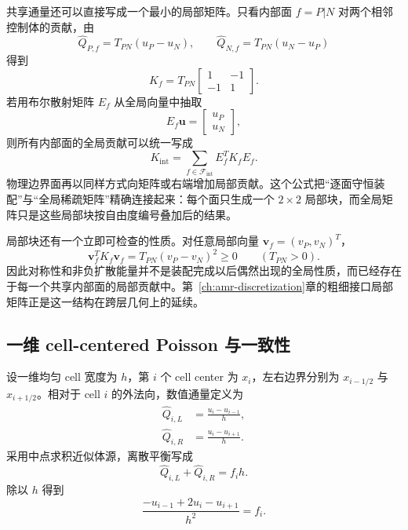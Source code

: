 共享通量还可以直接写成一个最小的局部矩阵。只看内部面 $f=P|N$ 对两个相邻控制体的贡献，由
\begin{equation}
\widehat Q_{P,f}=T_{PN}(u_P-u_N),
\qquad
\widehat Q_{N,f}=T_{PN}(u_N-u_P)
\end{equation}
得到
\begin{equation}
\boxed{
K_f
=
T_{PN}
\begin{bmatrix}
1&-1\\
-1&1
\end{bmatrix}.
}
\label{eq:discretization-face-local-matrix}
\end{equation}
若用布尔散射矩阵 $E_f$ 从全局向量中抽取
\begin{equation}
E_f\bm u=
\begin{bmatrix}
u_P\\u_N
\end{bmatrix},
\end{equation}
则所有内部面的全局贡献可以统一写成
\begin{equation}
\boxed{
K_{\mathrm{int}}
=
\sum_{f\in\mathcal F_{\mathrm{int}}}
E_f^TK_fE_f.
}
\label{eq:discretization-face-assembly-sum}
\end{equation}
物理边界面再以同样方式向矩阵或右端增加局部贡献。这个公式把“逐面守恒装配”与“全局稀疏矩阵”精确连接起来：每个面只生成一个 $2\times2$ 局部块，而全局矩阵只是这些局部块按自由度编号叠加后的结果。

局部块还有一个立即可检查的性质。对任意局部向量 $\bm v_f=(v_P,v_N)^T$，
\begin{equation}
\bm v_f^TK_f\bm v_f
=
T_{PN}(v_P-v_N)^2
\ge0
\qquad (T_{PN}>0).
\label{eq:discretization-face-local-energy}
\end{equation}
因此对称性和非负扩散能量并不是装配完成以后偶然出现的全局性质，而已经存在于每一个共享内部面的局部贡献中。第~\ref{ch:amr-discretization}章的粗细接口局部矩阵正是这一结构在跨层几何上的延续。

\subsection{一维 cell-centered Poisson 与一致性}

设一维均匀 cell 宽度为 $h$，第 $i$ 个 cell center 为 $x_i$，左右边界分别为 $x_{i-1/2}$ 与 $x_{i+1/2}$。相对于 cell $i$ 的外法向，数值通量定义为
\begin{align}
\widehat Q_{i,L}&=\frac{u_i-u_{i-1}}{h},\\
\widehat Q_{i,R}&=\frac{u_i-u_{i+1}}{h}.
\end{align}
采用中点求积近似体源，离散平衡写成
\begin{equation}
\widehat Q_{i,L}+\widehat Q_{i,R}=f_i h.
\end{equation}
除以 $h$ 得到
\begin{equation}
\boxed{
\frac{-u_{i-1}+2u_i-u_{i+1}}{h^2}=f_i.
}
\label{eq:discretization-fv-one-dimensional-poisson}
\end{equation}

